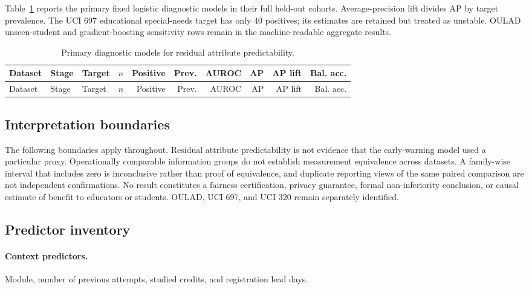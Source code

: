 \documentclass[education,supfile,submit,moreauthors]{Definitions/mdpi}
\begin{document}
Table~\ref{tab:s_c14proxy} reports the primary fixed logistic diagnostic models in their full held-out cohorts. Average-precision lift divides AP by target prevalence. The UCI 697 educational special-needs target has only 40 positives; its estimates are retained but treated as unstable. OULAD unseen-student and gradient-boosting sensitivity rows remain in the machine-readable aggregate results.

\tiny
\setlength{\tabcolsep}{1.3pt}
\begin{longtable}{p{}p{}p{}rrrrrrr}
\caption{Primary diagnostic models for residual attribute predictability.}\label{tab:s_c14proxy}\\
\toprule
Dataset & Stage & Target & $n$ & Positive & Prev. & AUROC & AP & AP lift & Bal. acc. \\
\midrule
\endfirsthead
\toprule
Dataset & Stage & Target & $n$ & Positive & Prev. & AUROC & AP & AP lift & Bal. acc. \\
\midrule
\endhead

\end{longtable}
\setlength{\tabcolsep}{6pt}
\normalsize

\subsection{Interpretation boundaries}

The following boundaries apply throughout. Residual attribute predictability is not evidence that the early-warning model used a particular proxy. Operationally comparable information groups do not establish measurement equivalence across datasets. A family-wise interval that includes zero is inconclusive rather than proof of equivalence, and duplicate reporting views of the same paired comparison are not independent confirmations. No result constitutes a fairness certification, privacy guarantee, formal non-inferiority conclusion, or causal estimate of benefit to educators or students. OULAD, UCI 697, and UCI 320 remain separately identified.

\subsection{Predictor inventory}

\paragraph{Context predictors.}
Module, number of previous attempts, studied credits, and registration lead days.
\end{document}
